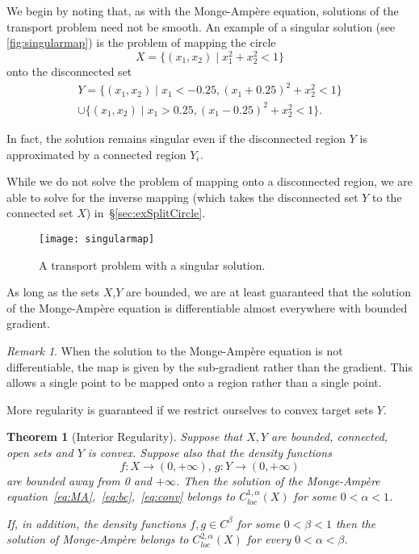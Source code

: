 \documentclass{amsart}
\newtheorem{theorem}{Theorem}
\theoremstyle{lemma}
\theoremstyle{remark}
\newtheorem{remark}{Remark}
\begin{document}
We begin by noting that, as with the {{Monge-Amp\`ere}\xspace} equation, solutions of the transport problem need not be smooth.  An example of a singular solution (see \autoref{fig:singularmap}) is the problem of mapping the circle
\[ X = \{(x_1,x_2)\mid x_1^2+x_2^2<1\} \]
onto the disconnected set
\begin{multline*} Y = \{(x_1,x_2)\mid x_1 < -0.25,(x_1+0.25)^2+x_2^2 < 1 \} \\ \cup \{(x_1,x_2)\mid x_1 > 0.25,(x_1-0.25)^2+x_2^2 < 1 \}.\end{multline*}

In fact, the solution remains singular even if the disconnected region $Y$ is approximated by a connected region $Y_\epsilon$.

While we do not solve the problem of mapping onto a disconnected region, we are able to solve for the inverse mapping (which takes the disconnected set $Y$ to the connected set $X$) in~\S\ref{sec:exSplitCircle}.  

\begin{figure}[htdp]
	\centering
        {\texttt{[image: singularmap]}}
  	\vspace*{-30pt}\caption{A transport problem with a singular solution.}
  	\label{fig:singularmap}
\end{figure} 

As long as the sets $X$,$Y$ are bounded, we are at least guaranteed that the solution of the {{Monge-Amp\`ere}\xspace} equation is differentiable almost everywhere with bounded gradient.

\begin{remark}
When the solution to the {{Monge-Amp\`ere}\xspace} equation is not differentiable, the map is given by the sub-gradient rather than the gradient.  This allows a single point to be mapped onto a region rather than a single point.
\end{remark}

More regularity is guaranteed if we restrict ourselves to convex target sets $Y$.
\begin{theorem}[Interior Regularity]\label{thm:intreg}
Suppose that $X,Y$ are bounded, connected, open sets and $Y$ is convex.  Suppose also that the density functions
\[ f:X\to(0,+\infty),\, g:Y\to(0,+\infty) \]
are bounded away from 0 and $+\infty$.  Then the solution of the {{Monge-Amp\`ere}\xspace} equation~\eqref{eq:MA},~\eqref{eq:bc},~\eqref{eq:conv} belongs to $C^{1,\alpha}_{loc}(X)$ for some $0<\alpha<1$.

If, in addition, the density functions $f,g\in C^\beta$ for some $0<\beta<1$ then the solution of {{Monge-Amp\`ere}\xspace} belongs to $C^{2,\alpha}_{loc}(X)$ for every $0<\alpha<\beta$.
\end{theorem}
\end{document}
